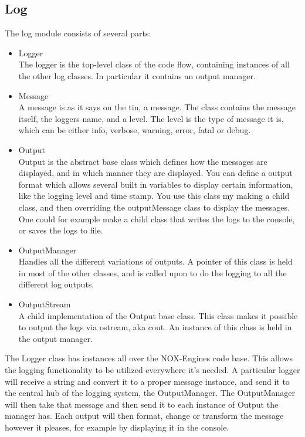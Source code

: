 \documentclass{article}
\begin{document}
\subsection{Log}
The log module consists of several parts:

\begin{itemize}

    \item Logger\\
    The logger is the top-level class of the code flow, containing instances of all the other log classes. 
	In particular it contains an output manager.

    \item Message\\
    A message is as it says on the tin, a message. 
	The class contains the message itself, the loggers name, and a level. 
	The level is the type of message it is, which can be either info, verbose, warning, error, fatal or debug.

    \item Output\\
    Output is the abstract base class which defines how the messages are displayed, and in which manner they are displayed. 
	You can define a output format which allows several built in variables to display certain information, like the logging level and time stamp. 
	You use this class my making a child class, and then overriding the outputMessage class to display the messages. 
	One could for example make a child class that writes the logs to the console, or saves the logs to file.

    \item OutputManager\\
    Handles all the different variations of outputs. 
	A pointer of this class is held in most of the other classes, and is called upon to do the logging to all the different log outputs.

    \item OutputStream\\
    A child implementation of the Output base class. 
	This class makes it possible to output the logs via ostream, aka cout. 
	An instance of this class is held in the output manager.

\end{itemize}

The Logger class has instances all over the NOX-Engines code base. This allows the logging functionality to be utilized everywhere it's needed. 
A particular logger will receive a string and convert it to a proper message instance, and send it to the central hub of the logging system, the OutputManager.
The OutputManager will then take that message and then send it to each instance of Output the manager has. Each output will then format, change or transform the message however it pleases, for example by displaying it in the console.
\end{document}
